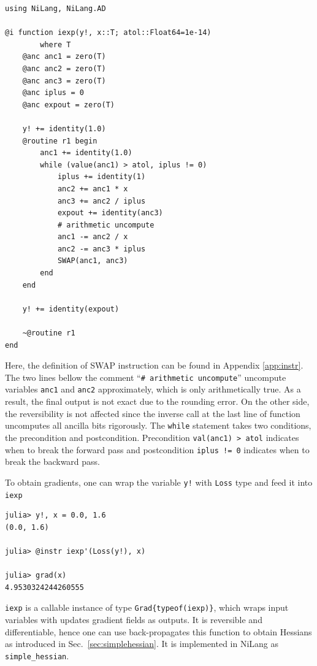 \documentclass[aps,twocolumn,longbibliography,english,superscriptaddress]{revtex4-1}
\newcommand{\<}{\langle}
\renewcommand{\>}{\rangle}
\newcommand{\Sec}[1]{Sec.~\ref{#1}}
\newcommand{\App}[1]{Appendix \ref{#1}}
\theoremstyle{definition}\newtheorem{definition}{\textit{Definition}}
\begin{document}
\begin{minipage}{.44\textwidth}
\begin{lstlisting}
using NiLang, NiLang.AD

@i function iexp(y!, x::T; atol::Float64=1e-14)
        where T
    @anc anc1 = zero(T)
    @anc anc2 = zero(T)
    @anc anc3 = zero(T)
    @anc iplus = 0
    @anc expout = zero(T)

    y! += identity(1.0)
    @routine r1 begin
        anc1 += identity(1.0)
        while (value(anc1) > atol, iplus != 0)
            iplus += identity(1)
            anc2 += anc1 * x
            anc3 += anc2 / iplus
            expout += identity(anc3)
            # arithmetic uncompute
            anc1 -= anc2 / x
            anc2 -= anc3 * iplus
            SWAP(anc1, anc3)
        end
    end

    y! += identity(expout)

    ~@routine r1
end
\end{lstlisting}
\end{minipage}

Here, the definition of SWAP instruction can be found in \App{app:instr}.
The two lines bellow the comment ``\texttt{\# arithmetic uncompute}'' uncompute variables \texttt{anc1} and \texttt{anc2} approximately, which is only arithmetically true. As a result, the final output is not exact due to the rounding error. On the other side, the reversibility is not affected since the inverse call at the last line of function uncomputes all ancilla bits rigorously.
The \texttt{while} statement takes two conditions, the precondition and postcondition. Precondition \texttt{val(anc1) > atol} indicates when to break the forward pass and postcondition \texttt{iplus != 0} indicates when to break the backward pass.

To obtain gradients, one can wrap the variable \texttt{y!} with \texttt{Loss} type and feed it into \texttt{iexp\textquotesingle}

\begin{minipage}{.44\textwidth}
\begin{lstlisting}
julia> y!, x = 0.0, 1.6
(0.0, 1.6)

julia> @instr iexp'(Loss(y!), x)

julia> grad(x)
4.9530324244260555
\end{lstlisting}
\end{minipage}

\texttt{iexp\textquotesingle} is a callable instance of type \texttt{Grad\{typeof(iexp)\}}, which wraps input variables with updates gradient fields as outputs. It is reversible and differentiable, hence one can use back-propagates this function to obtain Hessians as introduced in \Sec{sec:simplehessian}. It is implemented in NiLang as   \texttt{simple\_hessian}.
\end{document}
